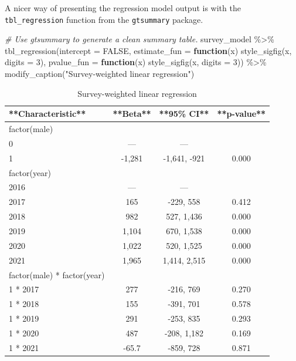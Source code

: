 \documentclass[
]{book}
\newenvironment{Shaded}{\begin{snugshade}}{\end{snugshade}}
\newcommand{\AttributeTok}[1]{\textcolor[rgb]{0.77,0.63,0.00}{#1}}
\newcommand{\CommentTok}[1]{\textcolor[rgb]{0.56,0.35,0.01}{\textit{#1}}}
\newcommand{\ConstantTok}[1]{\textcolor[rgb]{0.00,0.00,0.00}{#1}}
\newcommand{\ControlFlowTok}[1]{\textcolor[rgb]{0.13,0.29,0.53}{\textbf{#1}}}
\newcommand{\DecValTok}[1]{\textcolor[rgb]{0.00,0.00,0.81}{#1}}
\newcommand{\FunctionTok}[1]{\textcolor[rgb]{0.00,0.00,0.00}{#1}}
\newcommand{\NormalTok}[1]{#1}
\newcommand{\SpecialCharTok}[1]{\textcolor[rgb]{0.00,0.00,0.00}{#1}}
\newcommand{\StringTok}[1]{\textcolor[rgb]{0.31,0.60,0.02}{#1}}
\begin{document}
A nicer way of presenting the regression model output is with the \texttt{tbl\_regression} function from the \texttt{gtsummary} package.

\begin{Shaded}
\begin{Highlighting}[]
\CommentTok{\# Use gtsummary to generate a clean summary table.}
\NormalTok{survey\_model }\SpecialCharTok{\%\textgreater{}\%}
  \FunctionTok{tbl\_regression}\NormalTok{(}\AttributeTok{intercept =} \ConstantTok{FALSE}\NormalTok{, }
                 \AttributeTok{estimate\_fun =} \ControlFlowTok{function}\NormalTok{(x) }\FunctionTok{style\_sigfig}\NormalTok{(x, }\AttributeTok{digits =} \DecValTok{3}\NormalTok{),}
                 \AttributeTok{pvalue\_fun =} \ControlFlowTok{function}\NormalTok{(x) }\FunctionTok{style\_sigfig}\NormalTok{(x, }\AttributeTok{digits =} \DecValTok{3}\NormalTok{)) }\SpecialCharTok{\%\textgreater{}\%}
  \FunctionTok{modify\_caption}\NormalTok{(}\StringTok{"Survey{-}weighted linear regression"}\NormalTok{)}
\end{Highlighting}
\end{Shaded}

\begin{table}

\caption{\label{tab:unnamed-chunk-73}Survey-weighted linear regression}
\centering
\begin{tabular}[t]{l|c|c|c}
\hline
**Characteristic** & **Beta** & **95\% CI** & **p-value**\\
\hline
factor(male) &  &  & \\
\hline
0 & — & — & \\
\hline
1 & -1,281 & -1,641, -921 & 0.000\\
\hline
factor(year) &  &  & \\
\hline
2016 & — & — & \\
\hline
2017 & 165 & -229, 558 & 0.412\\
\hline
2018 & 982 & 527, 1,436 & 0.000\\
\hline
2019 & 1,104 & 670, 1,538 & 0.000\\
\hline
2020 & 1,022 & 520, 1,525 & 0.000\\
\hline
2021 & 1,965 & 1,414, 2,515 & 0.000\\
\hline
factor(male) * factor(year) &  &  & \\
\hline
1 * 2017 & 277 & -216, 769 & 0.270\\
\hline
1 * 2018 & 155 & -391, 701 & 0.578\\
\hline
1 * 2019 & 291 & -253, 835 & 0.293\\
\hline
1 * 2020 & 487 & -208, 1,182 & 0.169\\
\hline
1 * 2021 & -65.7 & -859, 728 & 0.871\\
\hline
\end{tabular}
\end{table}
\end{document}
